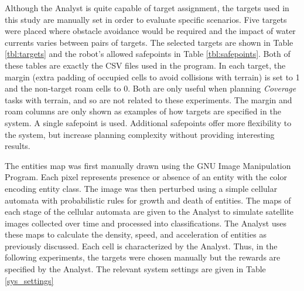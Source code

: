 \documentclass{tamuccthesis}
\begin{document}
Although the Analyst is quite capable of target assignment, the targets used in this study are manually set in order to evaluate specific scenarios. Five targets were placed where obstacle avoidance would be required and the impact of water currents varies between pairs of targets. The selected targets are shown in Table \ref{tbl:targets} and the robot's allowed safepoints in Table \ref{tbl:safepoints}. Both of these tables are exactly the CSV files used in the program. In each target, the margin (extra padding of occupied cells to avoid collisions with terrain) is set to 1 and the non-target roam cells to 0. Both are only useful when planning \textit{Coverage} tasks with terrain, and so are not related to these experiments. The margin and roam columns are only shown as examples of how targets are specified in the system. A single safepoint is used. Additional safepoints offer more flexibility to the system, but increase planning complexity without providing interesting results. 

The entities map was first manually drawn using the GNU Image Manipulation Program. Each pixel represents presence or absence of an entity with the color encoding entity class. The image was then perturbed using a simple cellular automata with probabilistic rules for growth and death of entities. The maps of each stage of the cellular automata are given to the Analyst to simulate satellite images collected over time and processed into classifications. The Analyst uses these maps to calculate the density, speed, and acceleration of entities as previously discussed. Each cell is characterized by the Analyst. Thus, in the following experiments, the targets were chosen manually but the rewards are specified by the Analyst. The relevant system settings are given in Table \ref{sys_settings}
\end{document}
